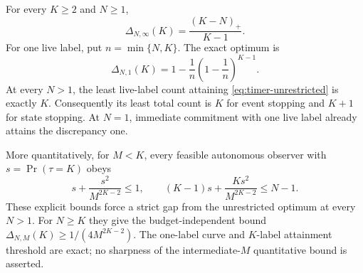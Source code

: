 \begin{theorem}\label{thm:timer-frontier}
For every $K\ge2$ and $N\ge1$,
\begin{equation}\label{eq:timer-unrestricted}
 \Delta_{N,\infty}(K)=\frac{(K-N)_+}{K-1}.
\end{equation}
For one live label, put $n=\min\{N,K\}$. The exact optimum is
\begin{equation}\label{eq:timer-one-state}
 \Delta_{N,1}(K)=1-\frac1n\left(1-\frac1n\right)^{K-1}.
\end{equation}
At every $N>1$, the least live-label count attaining \eqref{eq:timer-unrestricted} is exactly $K$. Consequently its least total count is $K$ for event stopping and $K+1$ for state stopping. At $N=1$, immediate commitment with one live label already attains the discrepancy one.

More quantitatively, for $M<K$, every feasible autonomous observer with $s=\Pr(\tau=K)$ obeys
\begin{equation}\label{eq:timer-pumping}
 s+\frac{s^2}{M^{2K-2}}\le1,
 \qquad
 (K-1)s+\frac{K s^2}{M^{2K-2}}\le N-1.
\end{equation}
These explicit bounds force a strict gap from the unrestricted optimum at every $N>1$. For $N\ge K$ they give the budget-independent bound
$\Delta_{N,M}(K)\ge 1/(4M^{2K-2})$.
The one-label curve and $K$-label attainment threshold are exact; no sharpness of the intermediate-$M$ quantitative bound is asserted.
\end{theorem}
